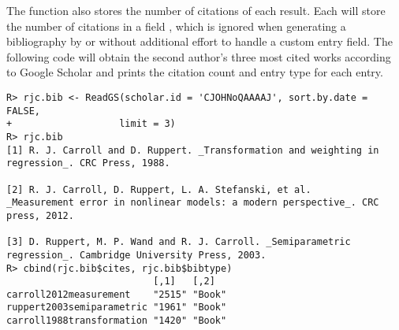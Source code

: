 \documentclass[article]{jss}\usepackage[]{graphicx}\usepackage[]{color}
\makeatletter
\newenvironment{kframe}{%
 \def\at@end@of@kframe{}%
 \ifinner\ifhmode%
  \def\at@end@of@kframe{\end{minipage}}%
  \begin{minipage}{\columnwidth}%
 \fi\fi%
 \def\FrameCommand##1{\hskip\@totalleftmargin \hskip-\fboxsep
 \colorbox{shadecolor}{##1}\hskip-\fboxsep
     \hskip-\linewidth \hskip-\@totalleftmargin \hskip\columnwidth}%
 \MakeFramed {\advance\hsize-\width
   \@totalleftmargin\z@ \linewidth\hsize
   \@setminipage}}%
 {\par\unskip\endMakeFramed%
 \at@end@of@kframe}
\newenvironment{knitrout}{}{} %
\makeatother
\begin{document}
The function also stores the number of citations of each result.  Each  will store the number of citations in a field , which is ignored when generating a bibliography by \Biblatex{} or \Bibtex{} without additional effort to handle a custom entry field.  The following code will obtain the second author's three most cited works according to Google Scholar and prints the citation count and entry type for each entry.
\begin{knitrout}
\color{fgcolor}\begin{kframe}
\begin{verbatim}
R> rjc.bib <- ReadGS(scholar.id = 'CJOHNoQAAAAJ', sort.by.date = FALSE, 
+                   limit = 3)
R> rjc.bib
[1] R. J. Carroll and D. Ruppert. _Transformation and weighting in
regression_. CRC Press, 1988.

[2] R. J. Carroll, D. Ruppert, L. A. Stefanski, et al.
_Measurement error in nonlinear models: a modern perspective_. CRC
press, 2012.

[3] D. Ruppert, M. P. Wand and R. J. Carroll. _Semiparametric
regression_. Cambridge University Press, 2003.
R> cbind(rjc.bib$cites, rjc.bib$bibtype)
                          [,1]   [,2]  
carroll2012measurement    "2515" "Book"
ruppert2003semiparametric "1961" "Book"
carroll1988transformation "1420" "Book"
\end{verbatim}
\end{kframe}
\end{knitrout}
\end{document}
